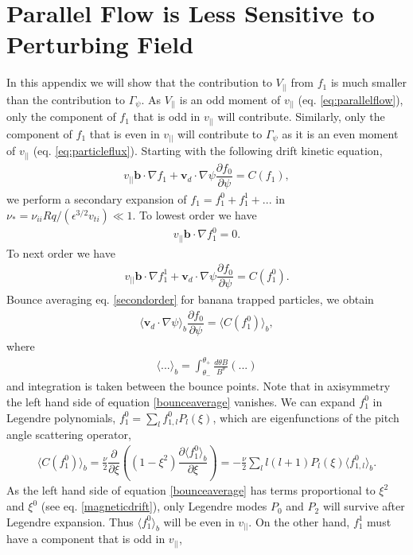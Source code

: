 \documentclass{article}
\numberwithin{figure}{section}
\numberwithin{equation}{section}
\newcommand{\partder}[2]{\dfrac{\partial  #1}{\partial  #2}} %
\begin{document}
\section{Parallel Flow is Less Sensitive to Perturbing Field} \label{parallelflow}
In this appendix we will show that the contribution to $V_{||}$ from $f_1$ is much smaller than the contribution to $\Gamma_{\psi}$. As $V_{||}$ is an odd moment of $v_{||}$ (eq. \ref{eq:parallelflow}), only the component of $f_1$ that is odd in $v_{||}$ will contribute. Similarly, only the component of $f_1$ that is even in $v_{||}$ will contribute to $\Gamma_{\psi}$ as it is an even moment of $v_{||}$ (eq. \ref{eq:particleflux}). Starting with the following drift kinetic equation,
\begin{gather}
v_{||} \bm{b} \cdot \nabla f_1 + \bm{v}_d \cdot \nabla \psi \partder{f_0}{\psi} = C(f_1),
\end{gather}
we perform a secondary expansion of $f_1 = f_1^0 + f_1^1 + ...$ in $\nu_* = \nu_{ii} Rq/(\epsilon^{3/2} v_{ti}) \ll 1$. To lowest order we have
\begin{gather}
v_{||} \bm{b} \cdot \nabla f_1^0 = 0.
\label{firstorder}
\end{gather}
To next order we have
\begin{gather}
v_{||} \bm{b} \cdot \nabla f_1^1 + \bm{v}_d \cdot \nabla \psi \partder{f_0}{\psi} = C(f_1^0).
\label{secondorder}
\end{gather}
Bounce averaging eq. \ref{secondorder} for banana trapped particles, we obtain
\begin{gather}
\langle \bm{v}_d \cdot \nabla \psi \rangle_b \partder{f_0}{\psi} = \langle C(f_1^0) \rangle_b,
\label{bounceaverage}
\end{gather}
where 
\begin{gather}
\langle ... \rangle_b = \int_{\theta_-}^{\theta_+} \frac{d \theta B}{B^{\theta}} (...)
\end{gather}
and integration is taken between the bounce points. Note that in axisymmetry the left hand side of equation \ref{bounceaverage} vanishes. We can expand $f_1^0$ in Legendre polynomials, $f_1^0 = \sum_l f_{1,l}^0 P_l(\xi)$, which are eigenfunctions of the pitch angle scattering operator, 
\begin{gather}
\langle C(f_1^0) \rangle_b = \frac{\nu}{2} \partder{}{\xi} \left( \left(1 - \xi^2\right) \partder{\langle f^0_1\rangle_b}{\xi}  \right) = -\frac{\nu}{2} \sum_l l(l+1)  P_l(\xi) \langle f_{1,l}^0 \rangle_b.
\end{gather}
As the left hand side of equation \ref{bounceaverage} has terms proportional to $\xi^2$ and $\xi^0$ (see eq. \ref{magneticdrift}), only Legendre modes $P_0$ and $P_2$ will survive after Legendre expansion. Thus $\langle f_1^0 \rangle_b$ will be even in $v_{||}$. On the other hand, $f_{1}^1$ must have a component that is odd in $v_{||}$,
\end{document}
